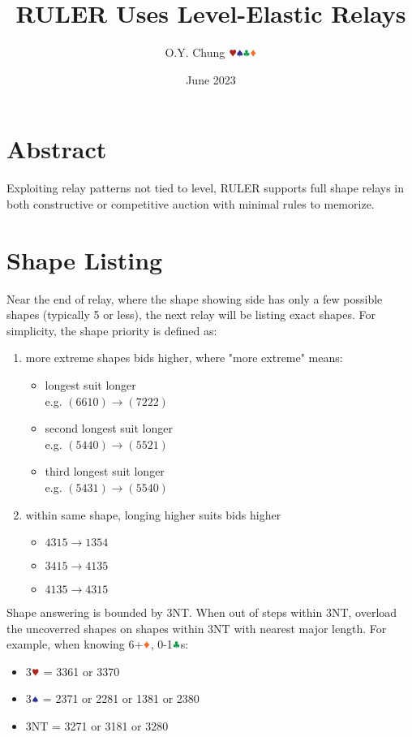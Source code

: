 \documentclass{article}
\title{RULER Uses Level-Elastic Relays}
\author{O.Y. Chung $\hhh\sss\ccc\ddd$}
\date{June 2023}
\begin{document}
\maketitle
\begin{multicols}{2}
\begin{CJK*}{UTF8}{gt}

\section{Abstract}
Exploiting relay patterns not tied to level, RULER supports full shape relays in both constructive or competitive auction with minimal rules to memorize.

\section{Shape Listing}
Near the end of relay, where the shape showing side has only a few possible shapes (typically 5 or less), the next relay will be listing exact shapes. For simplicity, the shape priority is defined as:

\begin{enumerate}
    \item more extreme shapes bids higher, where "more extreme" means:
    \begin{itemize}
        \item longest suit longer \\
            e.g. $(6610) \rightarrow (7222)$
        \item second longest suit longer \\
            e.g. $(5440) \rightarrow (5521)$
        \item third longest suit longer \\
            e.g. $(5431) \rightarrow (5540)$
    \end{itemize}
    \item within same shape, longing higher suits bids higher
    \begin{itemize}
        \item $4315 \rightarrow 1354$
        \item $3415 \rightarrow 4135$
        \item $4135 \rightarrow 4315$
    \end{itemize}
\end{enumerate}

\noindent Shape answering is bounded by 3NT. When out of steps within 3NT, overload the uncoverred shapes on shapes within 3NT with nearest major length. For example, when knowing 6+$\ddd$, 0-1$\ccc$s:
\begin{itemize}
    \item 3$\hhh$ = 3361 or 3370
    \item 3$\sss$ = 2371 or 2281 or 1381 or 2380
    \item 3NT = 3271 or 3181 or 3280
\end{itemize}


\end{CJK*}
\end{multicols}
\end{document}
